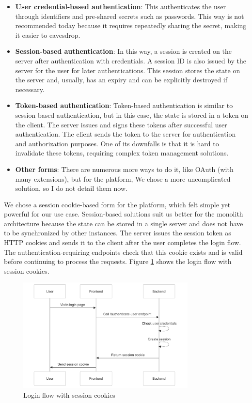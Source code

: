 \begin{itemize}
    \item \textbf{User credential-based authentication}: This authenticates the user through identifiers and pre-shared secrets such as passwords. This way is not recommended today because it requires repeatedly sharing the secret, making it easier to eavesdrop.
    \item \textbf{Session-based authentication}: In this way, a session is created on the server after authentication with credentials. A session ID is also issued by the server for the user for later authentications. This session stores the state on the server and, usually, has an expiry and can be explicitly destroyed if necessary.
    \item \textbf{Token-based authentication}: Token-based authentication is similar to session-based authentication, but in this case, the state is stored in a token on the client. The server issues and signs these tokens after successful user authentication. The client sends the token to the server for authentication and authorization purposes. One of its downfalls is that it is hard to invalidate these tokens, requiring complex token management solutions.
    \item \textbf{Other forms}: There are numerous more ways to do it, like OAuth (with many extensions), but for the platform, We chose a more uncomplicated solution, so I  do not detail them now.
\end{itemize}

We chose a session cookie-based form for the platform, which felt simple yet powerful for our use case. Session-based solutions suit us better for the monolith architecture because the state can be stored in a single server and does not have to be synchronized by other instances. The server issues the session token as HTTP cookies and sends it to the client after the user completes the login flow. The authentication-requiring endpoints check that this cookie exists and is valid before continuing to process the requests. Figure \ref{fig:authentication-sequence} shows the login flow with session cookies.

\begin{figure}[H]
    \centering
    \includegraphics[width=0.8\textwidth, keepaspectratio]{figures/authentication-sequence.png}
    \caption{Login flow with session cookies}
    \label{fig:authentication-sequence}
\end{figure}

